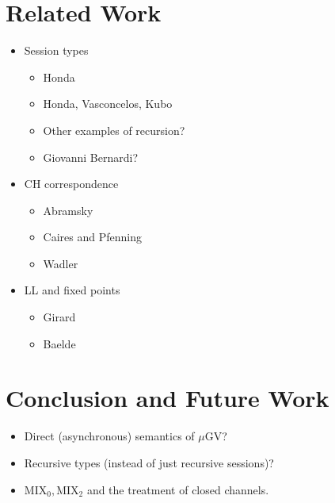 \documentclass[orivec,envcountsame]{llncs}
\newcommand{\mugv}{$\mu\mathrm{GV}$\xspace}
\begin{document}
\section{Related Work}\label{sec:related}

\begin{itemize}
\item Session types
  \begin{itemize}
  \item Honda
  \item Honda, Vasconcelos, Kubo
  \item Other examples of recursion?
  \item Giovanni Bernardi?
  \end{itemize}
\item CH correspondence
  \begin{itemize}
  \item Abramsky~\cite{Abramsky92,BellinScott94}
  \item Caires and Pfenning~\cite{CairesPfenning10}
  \item Wadler~\cite{Wadler12}
  \end{itemize}
\item LL and fixed points
  \begin{itemize}
  \item Girard~\cite{Girard87}
  \item Baelde~\cite{Baelde12}
  \end{itemize}
\end{itemize}

\section{Conclusion and Future Work}\label{sec:future}

\begin{itemize}
\item Direct (asynchronous) semantics of \mugv{}?
\item Recursive types (instead of just recursive sessions)?
\item $\mathrm{MIX}_0,\mathrm{MIX}_2$ and the treatment of closed channels.
\end{itemize}

\label{sect:bib}


\end{document}
